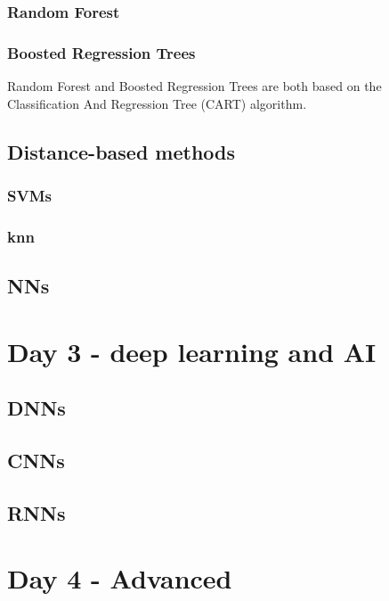 \documentclass[a4paper,twoside]{tufte-book}\usepackage[]{graphicx}\usepackage[]{color}
\begin{document}
\subsection{Random Forest}
\citep[BRT,][]{Friedman2001}

\subsection{Boosted Regression Trees}
\citep[RF,][]{Breiman2001a}

%
Random Forest \citep[RF,][]{Breiman2001a} and Boosted Regression Trees \citep[BRT,][]{Friedman2001} are both based on the Classification And Regression Tree (CART) algorithm.
%


\section{Distance-based methods}

\subsection{SVMs}

\subsection{knn}

\section{NNs}


\chapter{Day 3 - deep learning and AI}

\section{DNNs}

\section{CNNs}

\section{RNNs}

\chapter{Day 4 - Advanced}
\end{document}
